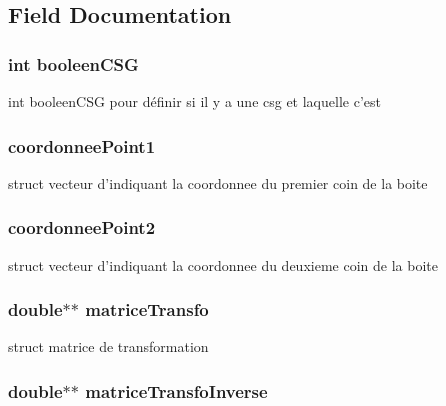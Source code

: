 \subsection{Field Documentation}
\hypertarget{structbox_a4428e32d4383f7dee25e5a4cb192da24}{
\subsubsection[{booleenCSG}]{\setlength{\rightskip}{0pt plus 5cm}int {\bf booleenCSG}}}
\label{structbox_a4428e32d4383f7dee25e5a4cb192da24}
int booleenCSG pour définir si il y a une csg et laquelle c'est \hypertarget{structbox_a180a8d8578462a26294d0dc2d18ce3cf}{
\subsubsection[{coordonneePoint1}]{ {\bf coordonneePoint1}}}
\label{structbox_a180a8d8578462a26294d0dc2d18ce3cf}
struct vecteur d'indiquant la coordonnee du premier coin de la boite \hypertarget{structbox_aabe806f54c4c0bae52e67e84c89f9942}{
\subsubsection[{coordonneePoint2}]{ {\bf coordonneePoint2}}}
\label{structbox_aabe806f54c4c0bae52e67e84c89f9942}
struct vecteur d'indiquant la coordonnee du deuxieme coin de la boite \hypertarget{structbox_aa06ccc348007e3355beccf412f2f656c}{
\subsubsection[{matriceTransfo}]{\setlength{\rightskip}{0pt plus 5cm}double$\ast$$\ast$ {\bf matriceTransfo}}}
\label{structbox_aa06ccc348007e3355beccf412f2f656c}
struct matrice de transformation \hypertarget{structbox_acd7a3590501dcccfaefccbb658f83821}{
\subsubsection[{matriceTransfoInverse}]{\setlength{\rightskip}{0pt plus 5cm}double$\ast$$\ast$ {\bf matriceTransfoInverse}}}
